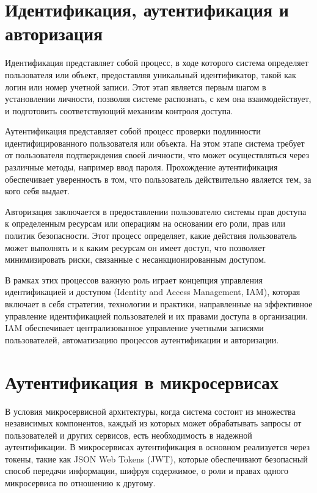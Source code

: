 \section{Идентификация, аутентификация и авторизация}
Идентификация представляет собой процесс, в ходе которого система определяет пользователя или объект, предоставляя уникальный идентификатор, такой как логин или номер учетной записи. Этот этап является первым шагом в установлении личности, позволяя системе распознать, с кем она взаимодействует, и подготовить соответствующий механизм контроля доступа.

Аутентификация представляет собой процесс проверки подлинности идентифицированного пользователя или объекта. На этом этапе система требует от пользователя подтверждения своей личности, что может осуществляться через различные методы, например ввод пароля. Прохождение аутентификация обеспечивает уверенность в том, что пользователь действительно является тем, за кого себя выдает.

Авторизация заключается в предоставлении пользователю системы прав доступа к определенным ресурсам или операциям на основании его роли, прав или политик безопасности. Этот процесс определяет, какие действия пользователь может выполнять и к каким ресурсам он имеет доступ, что позволяет минимизировать риски, связанные с несанкционированным доступом.

В рамках этих процессов важную роль играет концепция управления идентификацией и доступом (Identity and Access Management, IAM), которая включает в себя стратегии, технологии и практики, направленные на эффективное управление идентификацией пользователей и их правами доступа в организации. IAM обеспечивает централизованное управление учетными записями пользователей, автоматизацию процессов аутентификации и авторизации.~\cite{iam}


\section{Аутентификация в микросервисах}
В условия микросервисной архитектуры, когда система состоит из множества независимых компонентов, каждый из которых может обрабатывать запросы от пользователей и других сервисов, есть необходимость в надежной аутентификации. В микросервисах аутентификация в основном реализуется через токены, такие как JSON Web Tokens (JWT), которые обеспечивают безопасный способ передачи информации, шифруя содержимое, о роли и правах одного микросервиса по отношению к другому.

